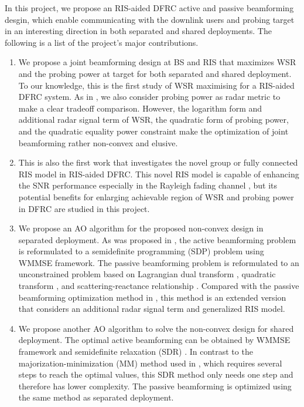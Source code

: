 In this project, we propose an RIS-aided DFRC active and passive beamforming desgin, which enable communicating 
with the downlink users and probing target in an interesting direction in both separated and shared deployments. 
The following is a list of the project's major contributions.

\begin{enumerate}
    \item We propose a joint beamforming design at BS and RIS that maximizes WSR and the probing power at target for both separated and shared deployment.
    To our knowledge, this is the first study of WSR maximising for a RIS-aided DFRC system. 
    As in \cite{xu2020tradeoff}, we also consider probing power as radar metric to make a clear tradeoff comparison. However, the logarithm 
    form and additional radar signal term of WSR, the quadratic form of probing power, and the quadratic equality power constraint make the 
    optimization of joint beamforming rather non-convex and elusive.

    \item This is also the first work that investigates the novel group or fully connected RIS model in RIS-aided DFRC. This novel RIS model is capable of enhancing the SNR performance especially in the Rayleigh fading channel \cite{shen2020modeling}, 
    but its potential benefits for enlarging achievable region of WSR and probing power in DFRC are studied in this project.
    
    \item We propose an AO algorithm for the proposed non-convex design in separated deployment.
    As was proposed in \cite{xu2020tradeoff}, the active beamforming problem is reformulated to 
    a semidefinite programming (SDP) problem using WMMSE framework. The passive beamforming 
    problem is reformulated to an unconstrained problem based on Lagrangian dual transform \cite{shen2018fractional2}, quadratic transform \cite{shen2018fractional},
    and scattering-reactance relationship \cite{shen2020modeling}. Compared with the passive beamforming optimization method in 
    \cite{guo2019WSR}, this method is an extended version that considers an additional radar signal term and generalized RIS model.
    
    \item We propose another AO algorithm to solve the non-convex design for shared deployment. 
    The optimal active beamforming can be obtained by WMMSE framework and semidefinite relaxation (SDR) \cite{luo2010semidefinite}. In contrast to 
    the majorization-minimization (MM) method used in \cite{xu2020tradeoff}, which requires several steps to reach the optimal 
    values, this SDR method only needs one step and therefore has lower complexity.
    The passive beamforming is optimized using the same method as separated deployment.


\end{enumerate}
